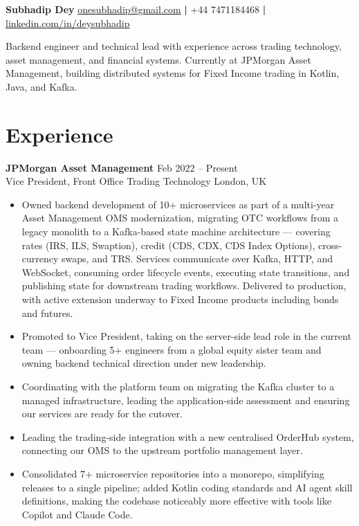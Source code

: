\documentclass[a4paper,9pt]{article}
\begin{document}
\noindent
\textbf{\LARGE Subhadip Dey} \hfill \href{mailto:onesubhadip@gmail.com}{onesubhadip@gmail.com} \textbf{|} +44 7471184468 \textbf{|} \href{https://www.linkedin.com/in/deysubhadip/}{linkedin.com/in/deysubhadip}

\vspace{4pt}
Backend engineer and technical lead with experience across trading technology, asset management, and financial systems. Currently at JPMorgan Asset Management, building distributed systems for Fixed Income trading in Kotlin, Java, and Kafka.
\vspace{4pt}

\section*{Experience}

\textbf{JPMorgan Asset Management} \hfill Feb 2022 -- Present \\
Vice President, Front Office Trading Technology \hfill London, UK \vspace{-5pt}\\

\begin{itemize}[left=0pt, label=\textbullet, itemsep=0pt, parsep=0pt, topsep=0pt, partopsep=0pt]
    \item Owned backend development of 10+ microservices as part of a multi-year Asset Management OMS modernization, migrating OTC workflows from a legacy monolith to a Kafka-based state machine architecture — covering rates (IRS, ILS, Swaption), credit (CDS, CDX, CDS Index Options), cross-currency swaps, and TRS. Services communicate over Kafka, HTTP, and WebSocket, consuming order lifecycle events, executing state transitions, and publishing state for downstream trading workflows. Delivered to production, with active extension underway to Fixed Income products including bonds and futures.
    \item Promoted to Vice President, taking on the server-side lead role in the current team — onboarding 5+ engineers from a global equity sister team and owning backend technical direction under new leadership.
    \item Coordinating with the platform team on migrating the Kafka cluster to a managed infrastructure, leading the application-side assessment and ensuring our services are ready for the cutover.
    \item Leading the trading-side integration with a new centralised OrderHub system, connecting our OMS to the upstream portfolio management layer.
    \item Consolidated 7+ microservice repositories into a monorepo, simplifying releases to a single pipeline; added Kotlin coding standards and AI agent skill definitions, making the codebase noticeably more effective with tools like Copilot and Claude Code.
\end{itemize}
\vspace{3pt}
\end{document}
